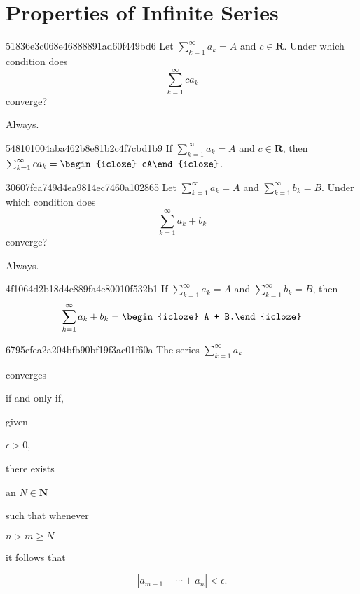 \section{Properties of Infinite Series} %
\begin{note}{51836e3c068e46888891ad60f449bd6}
    Let \({ \sum_{k=1}^{\infty} a_k = A }\) and \({ c \in \mathbf{R} }\).
    Under which condition does
    \[
        \sum_{k=1}^{\infty} ca_k
    \]
    converge?

    \begin{cloze}{1}
        Always.
    \end{cloze}
\end{note}

\begin{note}{548101004aba462b8e81b2c4f7cbd1b9}
    If \({ \sum_{k=1}^{\infty} a_k = A }\) and \({ c \in \mathbf{R} }\), then \({ \sum_{k=1}^{\infty} ca_k = \begin{icloze}{1}cA\end{icloze} }\).
\end{note}

\begin{note}{30607fca749d4ea9814ec7460a102865}
    Let \({ \sum_{k=1}^{\infty} a_k = A }\) and \({ \sum_{k=1}^{\infty} b_k = B }\).
    Under which condition does
    \[
        \sum_{k=1}^{\infty} a_k + b_k
    \]
    converge?

    \begin{cloze}{1}
        Always.
    \end{cloze}
\end{note}

\begin{note}{4f1064d2b18d4e889fa4e80010f532b1}
    If \({ \sum_{k=1}^{\infty} a_k = A }\) and \({ \sum_{k=1}^{\infty} b_k = B }\), then
    \[
        \sum_{k=1}^{\infty} a_k + b_k = \begin{icloze}{1}A + B.\end{icloze}
    \]
\end{note}

\begin{note}{6795efea2a204bfb90bf19f3ac01f60a}
    The series \({ \sum_{k=1}^{\infty} a_k }\) \begin{icloze}{5}converges\end{icloze} \begin{icloze}{4}if and only if,\end{icloze} given \begin{icloze}{3}\({ \epsilon > 0 }\),\end{icloze} there exists \begin{icloze}{2}an \({ N \in \mathbf{N} }\)\end{icloze} such that whenever \begin{icloze}{2}\({ n > m \geq N }\)\end{icloze} it follows that
    \begin{icloze}{1}
        \[
            \left\lvert a_{m + 1} + \cdots + a_n \right\rvert < \epsilon.
        \]
    \end{icloze}
\end{note}


